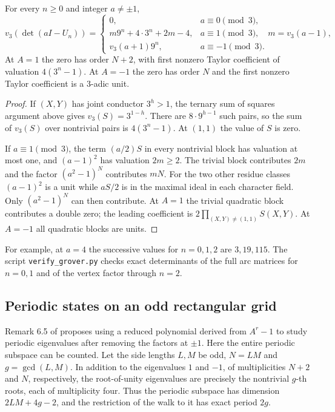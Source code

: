 \begin{theorem}
For every $n\ge0$ and integer $a\ne\pm1$,
\[
 v_3(\det(aI-U_n))=
 \begin{cases}
 0,& a\equiv0\pmod3,\\
 m9^n+4\cdot3^n+2m-4,& a\equiv1\pmod3,\quad m=v_3(a-1),\\
 v_3(a+1)9^n,&a\equiv-1\pmod3 .
 \end{cases}
\]
At $A=1$ the zero has order $N+2$, with first nonzero Taylor coefficient
of valuation $4(3^n-1)$. At $A=-1$ the zero has order $N$ and the
first nonzero Taylor coefficient is a $3$-adic unit.
\end{theorem}
\begin{proof}
If $(X,Y)$ has joint conductor $3^h>1$, the ternary sum of squares argument
above gives $v_3(S)=3^{1-h}$. There are $8\cdot9^{h-1}$ such pairs,
so the sum of $v_3(S)$ over nontrivial pairs is $4(3^n-1)$. At $(1,1)$
the value of $S$ is zero.

If $a\equiv1\pmod3$, the term $(a/2)S$ in every nontrivial block has
valuation at most one, and $(a-1)^2$ has valuation $2m\ge2$.
The trivial block contributes $2m$ and the factor $(a^2-1)^N$ contributes
$mN$. For the two other residue classes $(a-1)^2$ is a unit while $aS/2$
is in the maximal ideal in each character field. Only $(a^2-1)^N$
can then contribute. At $A=1$ the trivial quadratic block contributes
a double zero; the leading coefficient is $2\prod_{(X,Y)\ne(1,1)} S(X,Y)$.
At $A=-1$ all quadratic blocks are units.
\end{proof}

For example, at $a=4$ the successive values for $n=0,1,2$ are
$3,19,115$. The script \texttt{verify\_grover.py} checks exact determinants
of the full arc matrices for $n=0,1$ and of the vertex factor through $n=2$.

\subsection*{Periodic states on an odd rectangular grid}
Remark 6.5 of \cite{AHS} proposes using a reduced polynomial derived from
$A^r-1$ to study periodic eigenvalues after removing the factors at $\pm1$.
Here the entire periodic subspace can be counted. Let the side lengths
$L,M$ be odd, $N=LM$ and $g=\gcd(L,M)$. In addition to the eigenvalues
$1$ and $-1$, of multiplicities $N+2$ and $N$, respectively, the
root-of-unity eigenvalues are precisely the nontrivial $g$-th roots,
each of multiplicity four. Thus the periodic subspace has dimension
$2LM+4g-2$, and the restriction of the walk to it has exact period $2g$.

